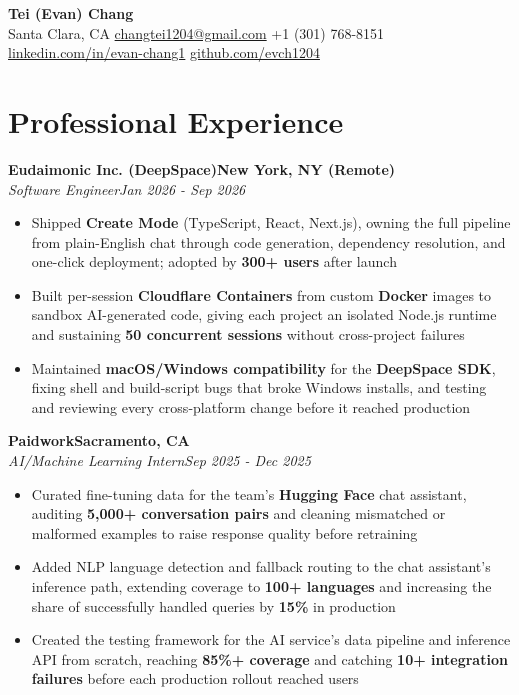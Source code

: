 \documentclass[letterpaper,11pt]{article}
\newcommand{\jobentry}[4]{%
  \textbf{#1}\hfill\textbf{#2}\\
  \textit{#3}\hfill\textit{#4}\par\vspace{1pt}}
\newcommand{\entrygap}{\vspace{4pt}}
\begin{document}
\begin{center}
  {\fontsize{22pt}{24pt}\selectfont\textbf{Tei (Evan) Chang}}\\[3pt]
  Santa Clara, CA \textbullet{} \href{mailto:changtei1204@gmail.com}{changtei1204@gmail.com} \textbullet{} +1 (301) 768-8151 \textbullet{} \href{https://linkedin.com/in/evan-chang1}{linkedin.com/in/evan-chang1} \textbullet{} \href{https://github.com/evch1204}{github.com/evch1204}
\end{center}

\section{Professional Experience}

\jobentry{Eudaimonic Inc. (DeepSpace)}{New York, NY (Remote)}{Software Engineer}{Jan 2026 - Sep 2026}
\begin{itemize}
  \item Shipped \textbf{Create Mode} (TypeScript, React, Next.js), owning the full pipeline from plain-English chat through code generation, dependency resolution, and one-click deployment; adopted by \textbf{300+ users} after launch
  \item Built per-session \textbf{Cloudflare Containers} from custom \textbf{Docker} images to sandbox AI-generated code, giving each project an isolated Node.js runtime and sustaining \textbf{50 concurrent sessions} without cross-project failures
  \item Maintained \textbf{macOS/Windows compatibility} for the \textbf{DeepSpace SDK}, fixing shell and build-script bugs that broke Windows installs, and testing and reviewing every cross-platform change before it reached production
\end{itemize}
\entrygap

\jobentry{Paidwork}{Sacramento, CA}{AI/Machine Learning Intern}{Sep 2025 - Dec 2025}
\begin{itemize}
  \item Curated fine-tuning data for the team's \textbf{Hugging Face} chat assistant, auditing \textbf{5,000+ conversation pairs} and cleaning mismatched or malformed examples to raise response quality before retraining
  \item Added NLP language detection and fallback routing to the chat assistant's inference path, extending coverage to \textbf{100+ languages} and increasing the share of successfully handled queries by \textbf{15\%} in production
  \item Created the testing framework for the AI service's data pipeline and inference API from scratch, reaching \textbf{85\%+ coverage} and catching \textbf{10+ integration failures} before each production rollout reached users
\end{itemize}
\entrygap
\end{document}
